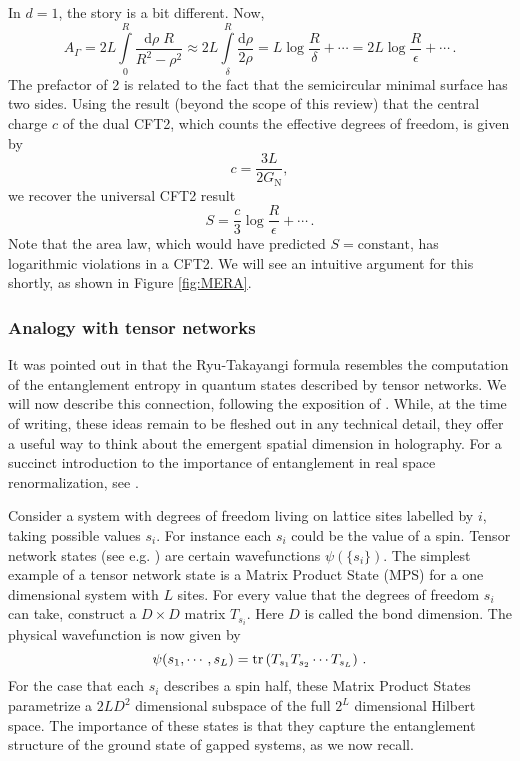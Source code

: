 \documentclass[10pt, oneside]{book}
\def\be{\begin{equation}}
\def\ee{\end{equation}}
\newcommand{\tr}{{\rm tr} }
\begin{document}
\begin{doublespace}
In $d=1$, the story is a bit different.   Now, \begin{equation}
A_\Gamma = 2L\int\limits_0^{R} \frac{\mathrm{d}\rho \; R}{R^2-\rho^2} \approx 2L\int\limits_\delta^R \frac{\mathrm{d}\rho}{2\rho} = L\log\frac{R}{\delta} + \cdots = 2L\log\frac{R}{\epsilon} +\cdots \,.
\end{equation}
The prefactor of 2 is related to the fact that the semicircular minimal surface has two sides.   Using the result (beyond the scope of this review) that the central charge $c$ of the dual CFT2, which counts the effective degrees of freedom, is given by \cite{Brown:1986nw} \begin{equation}
c = \frac{3L}{2G_{\mathrm{N}}},
\end{equation}
we recover the universal CFT2 result \cite{Calabrese:2004eu}
\begin{equation}
S = \frac{c}{3}\log \frac{R}{\epsilon} + \cdots \,.
\label{eq:CFT2EE}
\end{equation}
Note that the area law, which would have predicted $S=\text{constant}$, has logarithmic violations in a CFT2.  We will see an intuitive argument for this shortly, as shown in Figure \ref{fig:MERA}.

\subsubsection{Analogy with tensor networks}

It was pointed out in \cite{Swingle:2009bg} that the Ryu-Takayangi formula resembles the computation of the entanglement entropy  in quantum states described by tensor networks. We will now describe this connection, following the exposition of \cite{Hartman:2013qma}. While, at the time of writing, these ideas remain to be fleshed out in any technical detail, they offer a useful way to think about the emergent spatial dimension in holography. For a succinct introduction to the importance of entanglement in real space renormalization, see \cite{vidal}.

Consider a system with degrees of freedom living on lattice sites labelled by $i$, taking possible values $s_i$. For instance each $s_i$ could be the value of a spin. Tensor network states (see e.g. \cite{eisert}) are certain wavefunctions $\psi(\{s_i\})$. The simplest example of a tensor network state is a Matrix Product State (MPS) for a one dimensional system with $L$ sites. For every value that the degrees of freedom $s_i$ can take, construct a $D \times D$ matrix $T_{s_i}$. Here $D$ is called the bond dimension. The physical wavefunction is now given by
\be\label{eq:MPS}
\psi(s_1, \cdots, s_L) = \tr \left( T_{s_1} T_{s_2} \cdots T_{s_L}  \right) \,.
\ee
For the case that each $s_i$ describes a spin half, these Matrix Product States parametrize a $2 L D^2$ dimensional subspace of the full $2^L$ dimensional Hilbert space. The importance of these states is that they capture the entanglement structure of the ground state of gapped systems, as we now recall.


\end{doublespace}
\end{document}
